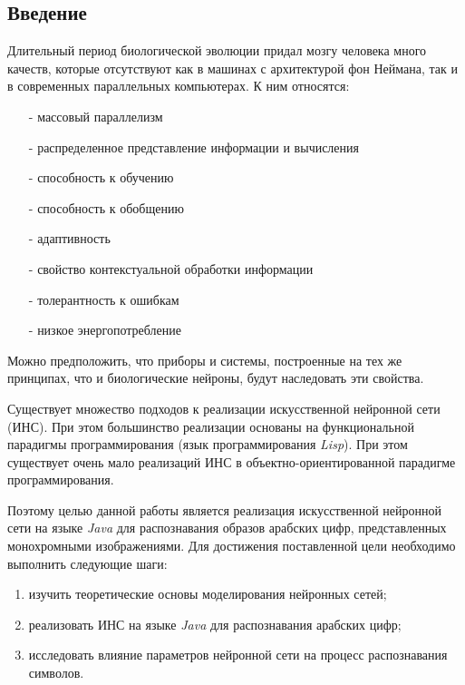 \begin{center}
\section*{Введение}
\end{center}


Длительный период биологической эволюции придал мозгу человека много качеств, которые отсутствуют как в машинах с архитектурой фон Неймана, так и в современных параллельных компьютерах.
К ним относятся:
\begin{itemize}
\item[-] массовый параллелизм
\item[-] распределенное представление информации и вычисления
\item[-] способность к обучению
\item[-] способность к обобщению
\item[-] адаптивность
\item[-] свойство контекстуальной обработки информации
\item[-] толерантность к ошибкам
\item[-] низкое энергопотребление
\end{itemize}
Можно предположить, что приборы и системы, построенные на тех же принципах, что и биологические нейроны, будут наследовать эти свойства.

Существует множество подходов к реализации искусственной нейронной сети (ИНС).
При этом большинство реализации основаны на функциональной парадигмы программирования (язык программирования {\it Lisp}).
При этом существует очень мало реализаций ИНС в объектно-ориентированной парадигме программирования.

Поэтому целью данной работы является реализация искусственной нейронной сети на языке {\it Java} для распознавания образов арабских цифр, представленных монохромными изображениями.
Для достижения поставленной цели необходимо выполнить следующие шаги:
\begin{enumerate}
\item изучить теоретические основы моделирования нейронных сетей;
\item реализовать ИНС на языке {\it Java} для распознавания арабских цифр;
\item исследовать влияние параметров нейронной сети на процесс распознавания символов.
\end{enumerate}


\newpage